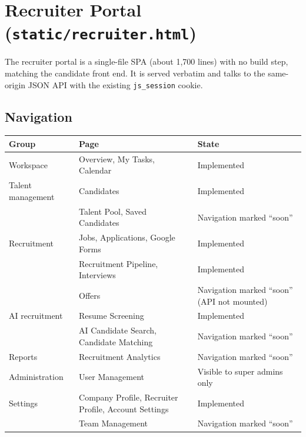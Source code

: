 \documentclass[11pt,a4paper]{article}
\newcommand{\file}[1]{\texttt{\small #1}}
\newcommand{\code}[1]{\texttt{#1}}
\begin{document}
\section{Recruiter Portal (\file{static/recruiter.html})}
\label{u:rec-ui}

The recruiter portal is a single-file SPA (about 1{,}700 lines) with no build
step, matching the candidate front end. It is served verbatim and talks to the
same-origin JSON API with the existing \code{js\_session} cookie.

\subsection{Navigation}
\begin{center}
\begin{tabular}{@{}llp{7.8cm}@{}}
\toprule
\textbf{Group} & \textbf{Page} & \textbf{State}\\
\midrule
Workspace & Overview, My Tasks, Calendar & Implemented\\
Talent management & Candidates & Implemented\\
 & Talent Pool, Saved Candidates & Navigation marked ``soon''\\
Recruitment & Jobs, Applications, Google Forms & Implemented\\
 & Recruitment Pipeline, Interviews & Implemented\\
 & Offers & Navigation marked ``soon'' (API not mounted)\\
AI recruitment & Resume Screening & Implemented\\
 & AI Candidate Search, Candidate Matching & Navigation marked ``soon''\\
Reports & Recruitment Analytics & Navigation marked ``soon''\\
Administration & User Management & Visible to super admins only\\
Settings & Company Profile, Recruiter Profile, Account Settings &
  Implemented\\
 & Team Management & Navigation marked ``soon''\\
\bottomrule
\end{tabular}
\end{center}
\end{document}
